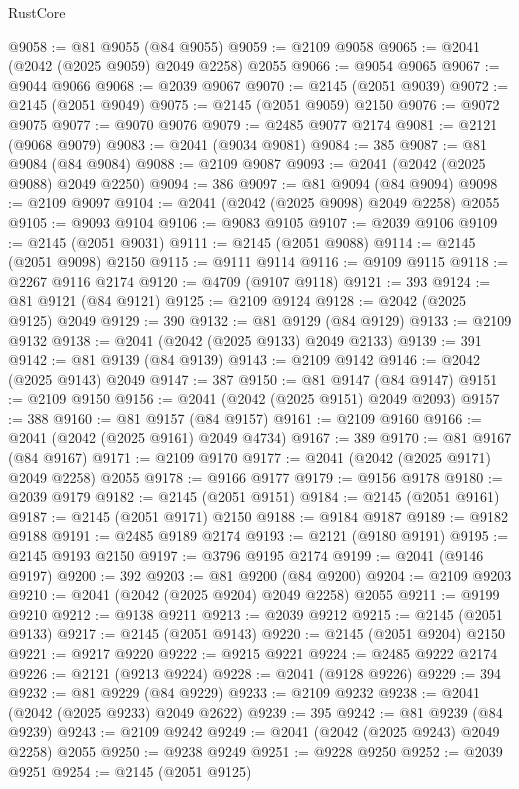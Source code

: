 \begin{lexlean}{RustCore}
\begin{coremodule}
@9058 := @81 @9055 (@84 @9055)
@9059 := @2109 @9058
@9065 := @2041 (@2042 (@2025 @9059) @2049 @2258) @2055
@9066 := @9054 @9065
@9067 := @9044 @9066
@9068 := @2039 @9067
@9070 := @2145 (@2051 @9039)
@9072 := @2145 (@2051 @9049)
@9075 := @2145 (@2051 @9059) @2150
@9076 := @9072 @9075
@9077 := @9070 @9076
@9079 := @2485 @9077 @2174
@9081 := @2121 (@9068 @9079)
@9083 := @2041 (@9034 @9081)
@9084 := 385
@9087 := @81 @9084 (@84 @9084)
@9088 := @2109 @9087
@9093 := @2041 (@2042 (@2025 @9088) @2049 @2250)
@9094 := 386
@9097 := @81 @9094 (@84 @9094)
@9098 := @2109 @9097
@9104 := @2041 (@2042 (@2025 @9098) @2049 @2258) @2055
@9105 := @9093 @9104
@9106 := @9083 @9105
@9107 := @2039 @9106
@9109 := @2145 (@2051 @9031)
@9111 := @2145 (@2051 @9088)
@9114 := @2145 (@2051 @9098) @2150
@9115 := @9111 @9114
@9116 := @9109 @9115
@9118 := @2267 @9116 @2174
@9120 := @4709 (@9107 @9118)
@9121 := 393
@9124 := @81 @9121 (@84 @9121)
@9125 := @2109 @9124
@9128 := @2042 (@2025 @9125) @2049
@9129 := 390
@9132 := @81 @9129 (@84 @9129)
@9133 := @2109 @9132
@9138 := @2041 (@2042 (@2025 @9133) @2049 @2133)
@9139 := 391
@9142 := @81 @9139 (@84 @9139)
@9143 := @2109 @9142
@9146 := @2042 (@2025 @9143) @2049
@9147 := 387
@9150 := @81 @9147 (@84 @9147)
@9151 := @2109 @9150
@9156 := @2041 (@2042 (@2025 @9151) @2049 @2093)
@9157 := 388
@9160 := @81 @9157 (@84 @9157)
@9161 := @2109 @9160
@9166 := @2041 (@2042 (@2025 @9161) @2049 @4734)
@9167 := 389
@9170 := @81 @9167 (@84 @9167)
@9171 := @2109 @9170
@9177 := @2041 (@2042 (@2025 @9171) @2049 @2258) @2055
@9178 := @9166 @9177
@9179 := @9156 @9178
@9180 := @2039 @9179
@9182 := @2145 (@2051 @9151)
@9184 := @2145 (@2051 @9161)
@9187 := @2145 (@2051 @9171) @2150
@9188 := @9184 @9187
@9189 := @9182 @9188
@9191 := @2485 @9189 @2174
@9193 := @2121 (@9180 @9191)
@9195 := @2145 @9193 @2150
@9197 := @3796 @9195 @2174
@9199 := @2041 (@9146 @9197)
@9200 := 392
@9203 := @81 @9200 (@84 @9200)
@9204 := @2109 @9203
@9210 := @2041 (@2042 (@2025 @9204) @2049 @2258) @2055
@9211 := @9199 @9210
@9212 := @9138 @9211
@9213 := @2039 @9212
@9215 := @2145 (@2051 @9133)
@9217 := @2145 (@2051 @9143)
@9220 := @2145 (@2051 @9204) @2150
@9221 := @9217 @9220
@9222 := @9215 @9221
@9224 := @2485 @9222 @2174
@9226 := @2121 (@9213 @9224)
@9228 := @2041 (@9128 @9226)
@9229 := 394
@9232 := @81 @9229 (@84 @9229)
@9233 := @2109 @9232
@9238 := @2041 (@2042 (@2025 @9233) @2049 @2622)
@9239 := 395
@9242 := @81 @9239 (@84 @9239)
@9243 := @2109 @9242
@9249 := @2041 (@2042 (@2025 @9243) @2049 @2258) @2055
@9250 := @9238 @9249
@9251 := @9228 @9250
@9252 := @2039 @9251
@9254 := @2145 (@2051 @9125)

\end{coremodule}
\end{lexlean}
